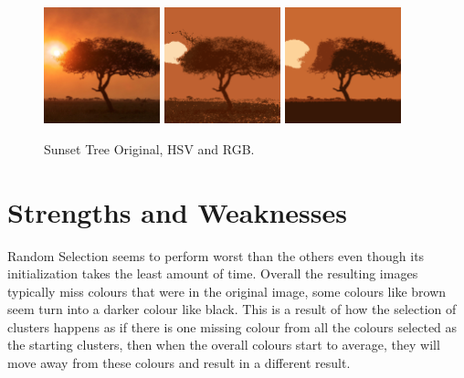 \documentclass{article}
\begin{document}
\begin{figure}[ht]
\begin{center}
\includegraphics[width=0.3\textwidth]{images/sunset_tree}
\includegraphics[width=0.3\textwidth]{images/hsv_5_sunset}
\includegraphics[width=0.3\textwidth]{images/rgb_5_sunset}
\caption{Sunset Tree Original, HSV and RGB.}
\label{fig:sunset}
\end{center}
\end{figure}


\section{Strengths and Weaknesses}

Random Selection seems to perform worst than the others even though its
initialization takes the least amount of time. Overall the resulting images
typically miss colours that were in the original image, some colours like brown
seem turn into a darker colour like black. This is a result of how the selection
of clusters happens as if there is one missing colour from all the colours
selected as the starting clusters, then when the overall colours start to
average, they will move away from these colours and result in a different
result.\\
  
\end{document}
